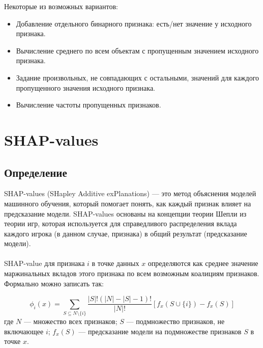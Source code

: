 Некоторые из возможных вариантов:
\begin{itemize}
	\item Добавление отдельного бинарного признака: есть/нет значение у исходного признака.
	\item Вычисление среднего по всем объектам с пропущенным значением исходного признака.
	\item Задание произвольных, не совпадающих с остальными, значений для каждого пропущенного значения исходного признака.
	\item Вычисление частоты пропущенных признаков.
\end{itemize}


\section*{SHAP-values}

\subsection*{Определение}
SHAP-values (SHapley Additive exPlanations) — это метод объяснения моделей машинного обучения, который помогает понять, как каждый признак влияет на предсказание модели. SHAP-values основаны на концепции теории Шепли из теории игр, которая используется для справедливого распределения вклада каждого игрока (в данном случае, признака) в общий результат (предсказание модели).\\\\
SHAP-value для признака $i$ в точке данных $x$ определяются как среднее значение маржинальных вкладов этого признака по всем возможным коалициям признаков. Формально можно записать так:

\[ \phi_i(x) = \sum_{S \subseteq N \setminus \{i\}} \frac{|S|!(|N|-|S|-1)!}{|N|!} [f_x(S \cup \{i\}) - f_x(S)] \]
где $N$ — множество всех признаков; $S$ — подмножество признаков, не включающее $i$; $f_x(S)$ — предсказание модели на подмножестве признаков $S$ в точке $x$.

